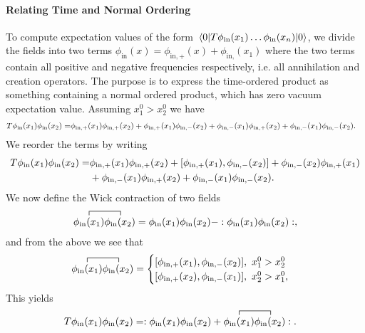 \paragraph{Relating Time and Normal Ordering}
To compute expectation values of the form $\expval{\ensuremath{T}\phi_{\text{in}}(x_{1})\dots\phi_{\text{in}}(x_{n})}{0}$, we divide the fields into two terms $\phi_{\text{in}}(x) = \phi_{\text{in}, +}(x) + \phi_{\text{in}, }(x_{1})$ where the two terms contain all positive and negative frequencies respectively, i.e. all annihilation and creation operators. The purpose is to express the time-ordered product as something containing a normal ordered product, which has zero vacuum expectation value. Assuming $x_{1}^{0} > x_{2}^{0}$ we have
\begin{align*}
	T\phi_{\text{in}}(x_{1})\phi_{\text{in}}(x_{2}) =& \phi_{\text{in}, +}(x_{1})\phi_{\text{in}, +}(x_{2}) + \phi_{\text{in}, +}(x_{1})\phi_{\text{in}, -}(x_{2}) + \phi_{\text{in}, -}(x_{1})\phi_{\text{in}, +}(x_{2}) + \phi_{\text{in}, -}(x_{1})\phi_{\text{in}, -}(x_{2}).
\end{align*}
We reorder the terms by writing
\begin{align*}
	\torp\phi_{\text{in}}(x_{1})\phi_{\text{in}}(x_{2}) =& \phi_{\text{in}, +}(x_{1})\phi_{\text{in}, +}(x_{2}) + \comm{\phi_{\text{in}, +}(x_{1})}{\phi_{\text{in}, -}(x_{2})} + \phi_{\text{in}, -}(x_{2})\phi_{\text{in}, +}(x_{1}) \\
	                                                     &+ \phi_{\text{in}, -}(x_{1})\phi_{\text{in}, +}(x_{2}) + \phi_{\text{in}, -}(x_{1})\phi_{\text{in}, -}(x_{2}).
\end{align*}
We now define the Wick contraction of two fields
\begin{align*}
	\contraction{}{\phi_{\text{in}}(x_{1})}{}{\phi_{\text{in}}(x_{2})}\phi_{\text{in}}(x_{1})\phi_{\text{in}}(x_{2}) = \phi_{\text{in}}(x_{1})\phi_{\text{in}}(x_{2}) - \nop{\phi_{\text{in}}(x_{1})\phi_{\text{in}}(x_{2})},
\end{align*}
and from the above we see that
\begin{align*}
	\contraction{}{\phi_{\text{in}}(x_{1})}{}{\phi_{\text{in}}(x_{2})}\phi_{\text{in}}(x_{1})\phi_{\text{in}}(x_{2}) =
	\begin{cases}
		\comm{\phi_{\text{in}, +}(x_{1})}{\phi_{\text{in}, -}(x_{2})},\ x_{1}^{0} > x_{2}^{0} \\
		\comm{\phi_{\text{in}, +}(x_{2})}{\phi_{\text{in}, -}(x_{1})},\ x_{2}^{0} > x_{1}^{0},
	\end{cases}
\end{align*}
This yields
\begin{align*}
	\torp\phi_{\text{in}}(x_{1})\phi_{\text{in}}(x_{2}) &= \nop{\phi_{\text{in}}(x_{1})\phi_{\text{in}}(x_{2}) + \contraction{}{\phi_{\text{in}}(x_{1})}{}{\phi_{\text{in}}(x_{2})}\phi_{\text{in}}(x_{1})\phi_{\text{in}}(x_{2})}.
\end{align*}

